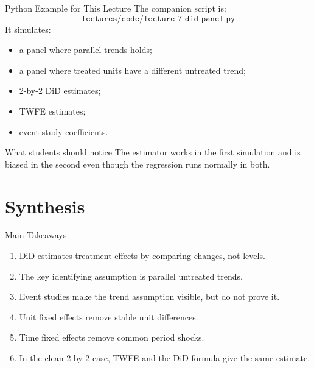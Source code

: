\documentclass[11pt,aspectratio=169]{beamer}
\begin{document}
\begin{frame}{Python Example for This Lecture}
  The companion script is:
  \[
    \texttt{lectures/code/lecture-7-did-panel.py}
  \]
  It simulates:
  \begin{itemize}
    \item a panel where parallel trends holds;
    \item a panel where treated units have a different untreated trend;
    \item 2-by-2 DiD estimates;
    \item TWFE estimates;
    \item event-study coefficients.
  \end{itemize}
  \begin{block}{What students should notice}
    The estimator works in the first simulation and is biased in the second even though the regression runs normally in both.
  \end{block}
\end{frame}

\section{Synthesis}

\begin{frame}{Main Takeaways}
  \begin{enumerate}
    \item DiD estimates treatment effects by comparing changes, not levels.
    \item The key identifying assumption is parallel untreated trends.
    \item Event studies make the trend assumption visible, but do not prove it.
    \item Unit fixed effects remove stable unit differences.
    \item Time fixed effects remove common period shocks.
    \item In the clean 2-by-2 case, TWFE and the DiD formula give the same estimate.
  \end{enumerate}
\end{frame}
\end{document}
